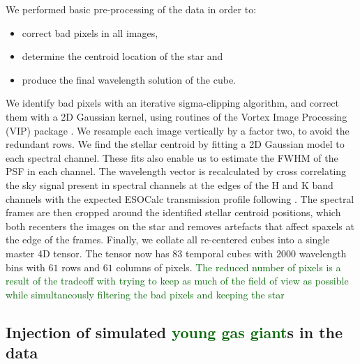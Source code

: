 \documentclass{aa}
\newcommand{\newchange}[1]{\textcolor{darkgreen}{#1}}
\begin{document}
We performed basic pre-processing of the data in order to:
\begin{itemize}
    \item correct bad pixels in all images,
    \item determine the centroid location of the star and
    \item produce the final wavelength solution of the cube. 
\end{itemize}
We identify bad pixels with an iterative sigma-clipping algorithm, and correct them with a 2D Gaussian kernel, using routines of the Vortex Image Processing (\textsc{VIP}) package \citep{2017AJGomezVIP,2023Christiaens}.
We resample each image vertically by a factor two, to avoid the redundant rows. 
We find the stellar centroid by fitting a 2D Gaussian model to each spectral channel. 
These fits also enable us to estimate the FWHM of the PSF in each channel. 
The wavelength vector is recalculated by cross correlating the sky signal present in spectral channels at the edges of the H and K band channels with the expected ESOCalc transmission profile following \cite{2018AHoeijmakersMM}. 
The spectral frames are then cropped around the identified stellar centroid positions, which both recenters the images on the star and removes artefacts that affect spaxels at the edge of the frames.
Finally, we collate all re-centered cubes into a single master 4D tensor.
The tensor now has $83$ temporal cubes with $2000$ wavelength bins with $61$ rows and $61$ columns of pixels.
\newchange{The reduced number of pixels is a result of the tradeoff with trying to keep as much of the field of view as possible while simultaneously filtering the bad pixels and keeping the star}

\subsection{Injection of simulated \newchange{young gas giant}s in the data}\label{sec: FC insertion}
\end{document}

